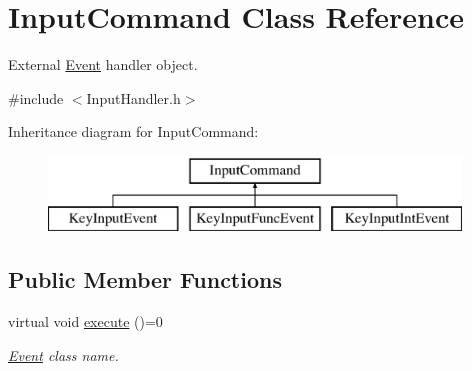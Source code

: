 \hypertarget{class_input_command}{\section{Input\+Command Class Reference}
\label{class_input_command}
}


External \hyperlink{class_event}{Event} handler object.  




{\ttfamily \#include $<$Input\+Handler.\+h$>$}

Inheritance diagram for Input\+Command\+:\begin{figure}[H]
\begin{center}
\leavevmode
\includegraphics[height=2.000000cm]{class_input_command}
\end{center}
\end{figure}
\subsection*{Public Member Functions}
\begin{DoxyCompactItemize}
\item 
\hypertarget{class_input_command_a636f23300e444dcc55f7898971874a8f}{virtual void \hyperlink{class_input_command_a636f23300e444dcc55f7898971874a8f}{execute} ()=0}\label{class_input_command_a636f23300e444dcc55f7898971874a8f}

\begin{DoxyCompactList}\small\item\em \hyperlink{class_event}{Event} class name. \end{DoxyCompactList}\end{DoxyCompactItemize}
